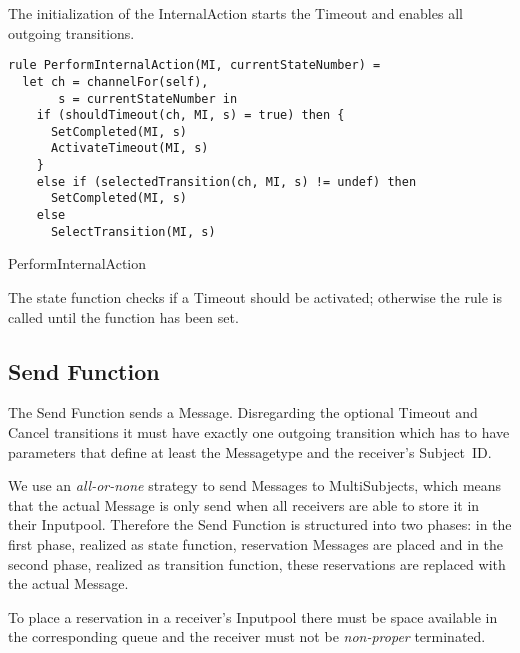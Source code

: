 The initialization of the InternalAction starts the Timeout and enables all
outgoing transitions.


\begin{listing}[H]
\begin{verbatim}
rule PerformInternalAction(MI, currentStateNumber) =
  let ch = channelFor(self),
       s = currentStateNumber in
    if (shouldTimeout(ch, MI, s) = true) then {
      SetCompleted(MI, s)
      ActivateTimeout(MI, s)
    }
    else if (selectedTransition(ch, MI, s) != undef) then
      SetCompleted(MI, s)
    else
      SelectTransition(MI, s)
\end{verbatim}
\caption{PerformInternalAction}
\label{lst:shortasm:PerformInternalAction}
\end{listing}


The state function checks if a Timeout should be activated; otherwise the
 rule is called until the  function has
been set.




\subsection{Send Function}


The Send Function sends a Message. Disregarding the optional Timeout and Cancel
transitions it must have exactly one outgoing transition which has to have parameters that
define at least the Messagetype and the receiver's Subject~ID.

We use an \textit{all-or-none} strategy to send Messages to MultiSubjects,
which means that the actual Message is only send when all receivers are able
to store it in their Inputpool. Therefore the Send Function is structured into
two phases: in the first phase, realized as state function, reservation Messages
are placed and in the second phase, realized as transition function, these reservations
are replaced with the actual Message.

To place a reservation in a receiver's Inputpool there must be space available
in the corresponding queue and the receiver must not be
\textit{non-proper} terminated.



